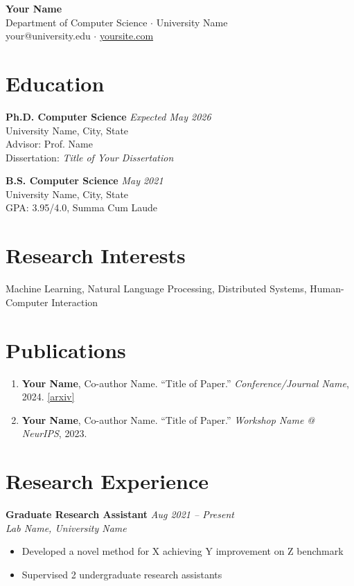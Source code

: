 \documentclass[11pt,a4paper]{article}
\begin{document}
\begin{center}
  {\Large \textbf{Your Name}} \\[4pt]
  Department of Computer Science $\cdot$ University Name \\
  your@university.edu $\cdot$ \href{https://yoursite.com}{yoursite.com}
\end{center}

\section{Education}
\textbf{Ph.D. Computer Science} \hfill \textit{Expected May 2026} \\
University Name, City, State \\
Advisor: Prof. Name \\
Dissertation: \textit{Title of Your Dissertation}

\vspace{4pt}
\textbf{B.S. Computer Science} \hfill \textit{May 2021} \\
University Name, City, State \\
GPA: 3.95/4.0, Summa Cum Laude

\section{Research Interests}
Machine Learning, Natural Language Processing, Distributed Systems, Human-Computer Interaction

\section{Publications}
\begin{enumerate}[leftmargin=*, noitemsep, topsep=2pt]
  \item \textbf{Your Name}, Co-author Name. ``Title of Paper.'' \textit{Conference/Journal Name}, 2024. \href{https://arxiv.org/abs/xxxx}{[arxiv]}
  \item \textbf{Your Name}, Co-author Name. ``Title of Paper.'' \textit{Workshop Name @ NeurIPS}, 2023.
\end{enumerate}

\section{Research Experience}
\textbf{Graduate Research Assistant} \hfill \textit{Aug 2021 -- Present} \\
\textit{Lab Name, University Name}
\begin{itemize}[leftmargin=*, noitemsep, topsep=2pt]
  \item Developed a novel method for X achieving Y improvement on Z benchmark
  \item Supervised 2 undergraduate research assistants
\end{itemize}
\end{document}
